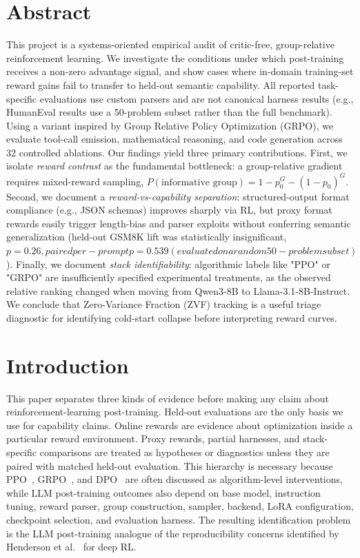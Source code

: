 \documentclass[12pt,a4paper]{report}
\begin{document}
\chapter*{Abstract}
This project is a systems-oriented empirical audit of critic-free, group-relative reinforcement learning. We investigate the conditions under which post-training receives a non-zero advantage signal, and show cases where in-domain training-set reward gains fail to transfer to held-out semantic capability. All reported task-specific evaluations use custom parsers and are not canonical harness results (e.g., HumanEval results use a 50-problem subset rather than the full benchmark). Using a variant inspired by Group Relative Policy Optimization (GRPO), we evaluate tool-call emission, mathematical reasoning, and code generation across 32 controlled ablations. Our findings yield three primary contributions. First, we isolate \textit{reward contrast} as the fundamental bottleneck: a group-relative gradient requires mixed-reward sampling, $P(\text{informative group}) = 1 - p_0^{G} - (1-p_0)^{G}$. Second, we document a \textit{reward-vs-capability separation}: structured-output format compliance (e.g., JSON schemas) improves sharply via RL, but proxy format rewards easily trigger length-bias and parser exploits without conferring semantic generalization (held-out GSM8K lift was statistically insignificant, $p=0.26, paired per-prompt p=0.539 (evaluated on a random 50-problem subset)$). Finally, we document \textit{stack identifiability}: algorithmic labels like "PPO" or "GRPO" are insufficiently specified experimental treatments, as the observed relative ranking changed when moving from Qwen3-8B to Llama-3.1-8B-Instruct. We conclude that Zero-Variance Fraction (ZVF) tracking is a useful triage diagnostic for identifying cold-start collapse before interpreting reward curves.

\tableofcontents
\listoffigures
\listoftables
\clearpage
{}

\chapter{Introduction}
\label{sec:intro}

This paper separates three kinds of evidence before making any claim about
reinforcement-learning post-training.  Held-out evaluations are the only basis
we use for capability claims.  Online rewards are evidence about optimization
inside a particular reward environment.  Proxy rewards, partial harnesses, and
stack-specific comparisons are treated as hypotheses or diagnostics unless they
are paired with matched held-out evaluation.  This hierarchy is necessary
because PPO~\citep{schulman2017proximal}, GRPO~\citep{shao2024deepseekmath},
and DPO~\citep{rafailov2024direct} are often discussed as algorithm-level
interventions, while LLM post-training outcomes also depend on base model,
instruction tuning, reward parser, group construction, sampler, backend, LoRA
configuration, checkpoint selection, and evaluation harness.  The resulting
identification problem is the LLM post-training analogue of the reproducibility
concerns identified by Henderson et al.~\citep{henderson2018deep} for deep RL.
\end{document}
